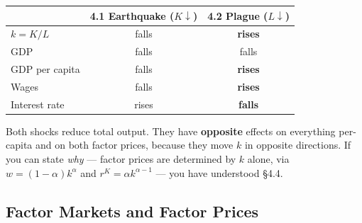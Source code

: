 \documentclass[12pt, letterpaper]{article}
\begin{document}
\begin{tcolorbox}[evenbox,title={Problem 4.2 \quad The Black Death}]
\begin{tcolorbox}[theorybox,title={Comparing 4.1 and 4.2 --- the pairing is deliberate}]
\begin{center}
\begin{tabular}{lcc}
\toprule
& \textbf{4.1 Earthquake ($K\downarrow$)} & \textbf{4.2 Plague ($L\downarrow$)} \\
\midrule
$k = K/L$          & falls & \textbf{rises} \\
GDP                & falls & falls \\
GDP per capita     & falls & \textbf{rises} \\
Wages              & falls & \textbf{rises} \\
Interest rate      & rises & \textbf{falls} \\
\bottomrule
\end{tabular}
\end{center}
Both shocks reduce total output. They have \textbf{opposite} effects on everything per-capita
and on both factor prices, because they move $k$ in opposite directions. If you can state
\emph{why} --- factor prices are determined by $k$ alone, via $w = (1-\alpha)k^\alpha$ and
$r^K = \alpha k^{\alpha-1}$ --- you have understood \S4.4.
\end{tcolorbox}
\end{tcolorbox}

\subsection{Factor Markets and Factor Prices}
\end{document}
